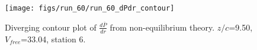 \begin{figure}[H]
\centering
\texttt{[image: figs/run\_60/run\_60\_dPdr\_contour]}
\caption{Diverging contour plot of $\frac{d\bar{P}}{dr}$ from non-equilibrium theory. $z/c$=9.50, $V_{free}$=33.04, station 6.}
\label{fig:run_60_dPdr_contour}
\end{figure}


